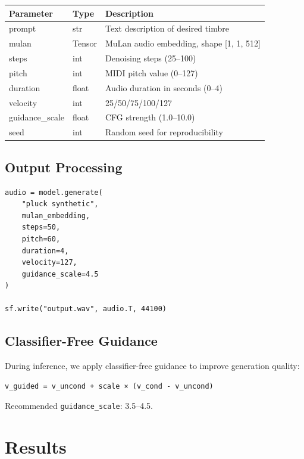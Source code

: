 \documentclass[11pt,a4paper]{article}
\begin{document}
\begin{table}[h]
\centering
\begin{tabular}{lll}
\toprule
\textbf{Parameter} & \textbf{Type} & \textbf{Description} \\
\midrule
prompt & str & Text description of desired timbre \\
mulan & Tensor & MuLan audio embedding, shape [1, 1, 512] \\
steps & int & Denoising steps (25--100) \\
pitch & int & MIDI pitch value (0--127) \\
duration & float & Audio duration in seconds (0--4) \\
velocity & int & 25/50/75/100/127 \\
guidance\_scale & float & CFG strength (1.0--10.0) \\
seed & int & Random seed for reproducibility \\
\bottomrule
\end{tabular}
\end{table}

\subsection{Output Processing}

\begin{verbatim}
audio = model.generate(
    "pluck synthetic",
    mulan_embedding,
    steps=50,
    pitch=60,
    duration=4,
    velocity=127,
    guidance_scale=4.5
)

sf.write("output.wav", audio.T, 44100)
\end{verbatim}

\subsection{Classifier-Free Guidance}

During inference, we apply classifier-free guidance to improve generation quality:

\begin{verbatim}
v_guided = v_uncond + scale × (v_cond - v_uncond)
\end{verbatim}

Recommended \texttt{guidance\_scale}: 3.5--4.5.

\section{Results}
\end{document}

